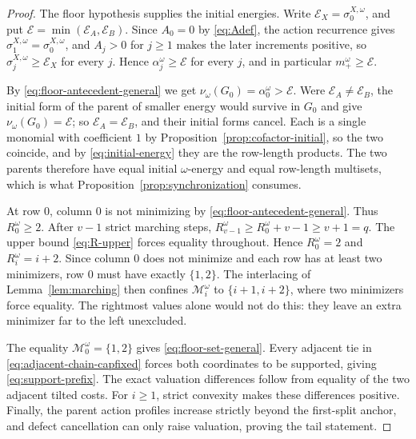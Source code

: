 \documentclass[11pt,a4paper]{amsart}
\numberwithin{equation}{section}
\theoremstyle{plain}
\theoremstyle{definition}
\newcommand{\wto}{\nu_{\omega}}
\begin{document}
\begin{proof}
The floor hypothesis supplies the initial energies.  Write \(\mathcal E_X=\sigma_0^{X,\omega}\), and put \(\mathcal E=\min(\mathcal E_A,\mathcal E_B)\).  Since \(A_0=0\) by \eqref{eq:Adef}, the action recurrence gives \(\sigma_1^{X,\omega}=\sigma_0^{X,\omega}\), and \(A_j>0\) for \(j\ge1\) makes the later increments positive, so \(\sigma_j^{X,\omega}\ge\mathcal E_X\) for every \(j\).  Hence \(\alpha_j^\omega\ge\mathcal E\) for every \(j\), and in particular \(m_+^\omega\ge\mathcal E\).

By \eqref{eq:floor-antecedent-general} we get \(\wto(G_0)=\alpha_0^\omega>\mathcal E\).  Were \(\mathcal E_A\ne\mathcal E_B\), the initial form of the parent of smaller energy would survive in \(G_0\) and give \(\wto(G_0)=\mathcal E\); so \(\mathcal E_A=\mathcal E_B\), and their initial forms cancel.  Each is a single monomial with coefficient \(1\) by Proposition~\ref{prop:cofactor-initial}, so the two coincide, and by \eqref{eq:initial-energy} they are the row-length products.  The two parents therefore have equal initial \(\omega\)-energy and equal row-length multisets, which is what Proposition~\ref{prop:synchronization} consumes.

At row \(0\), column \(0\) is not minimizing by \eqref{eq:floor-antecedent-general}.  Thus \(R_0^\omega\ge2\).  After \(v-1\) strict marching steps, \(R_{v-1}^\omega\ge R_0^\omega+v-1\ge v+1=q\).
The upper bound \eqref{eq:R-upper} forces equality throughout.  Hence \(R_0^\omega=2\) and \(R_i^\omega=i+2\).  Since column \(0\) does not minimize and each row has at least two minimizers, row \(0\) must have exactly \(\{1,2\}\).  The interlacing of Lemma~\ref{lem:marching} then confines \(\mathcal M_i^\omega\) to \(\{i+1,i+2\}\), where two minimizers force equality.  The rightmost values alone would not do this: they leave an extra minimizer far to the left unexcluded.

The equality \(\mathcal M_0^\omega=\{1,2\}\) gives \eqref{eq:floor-set-general}.  Every adjacent tie in \eqref{eq:adjacent-chain-capfixed} forces both coordinates to be supported, giving \eqref{eq:support-prefix}.  The exact valuation differences follow from equality of the two adjacent tilted costs.  For \(i\ge1\), strict convexity makes these differences positive.  Finally, the parent action profiles increase strictly beyond the first-split anchor, and defect cancellation can only raise valuation, proving the tail statement.
\end{proof}
\end{document}
